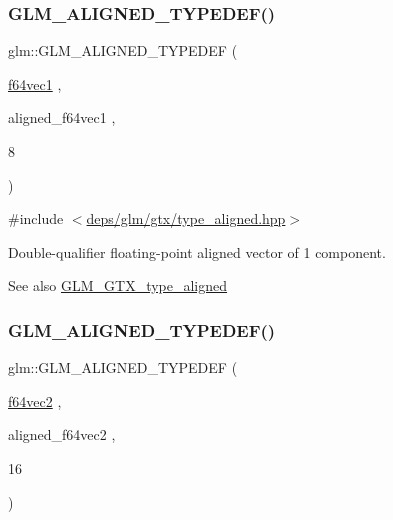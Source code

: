 \subsubsection{\texorpdfstring{G\+L\+M\+\_\+\+A\+L\+I\+G\+N\+E\+D\+\_\+\+T\+Y\+P\+E\+D\+E\+F()}{GLM\_ALIGNED\_TYPEDEF()}\hspace{0.1cm}{\footnotesize\ttfamily [159/209]}}
{\footnotesize\ttfamily glm\+::\+G\+L\+M\+\_\+\+A\+L\+I\+G\+N\+E\+D\+\_\+\+T\+Y\+P\+E\+D\+EF (\begin{DoxyParamCaption}\item[{\hyperlink{group__gtc__type__precision_ga6478d0530433bb907956a46b2cd99161}{f64vec1}}]{,  }\item[{aligned\+\_\+f64vec1}]{,  }\item[{8}]{ }\end{DoxyParamCaption})}



{\ttfamily \#include $<$\hyperlink{gtx_2type__aligned_8hpp}{deps/glm/gtx/type\+\_\+aligned.\+hpp}$>$}

Double-\/qualifier floating-\/point aligned vector of 1 component. \begin{DoxySeeAlso}{See also}
\hyperlink{group__gtx__type__aligned}{G\+L\+M\+\_\+\+G\+T\+X\+\_\+type\+\_\+aligned} 
\end{DoxySeeAlso}
\mbox{\label{group__gtx__type__aligned_ga32814aa0f19316b43134fc25f2aad2b9}} 
\subsubsection{\texorpdfstring{G\+L\+M\+\_\+\+A\+L\+I\+G\+N\+E\+D\+\_\+\+T\+Y\+P\+E\+D\+E\+F()}{GLM\_ALIGNED\_TYPEDEF()}\hspace{0.1cm}{\footnotesize\ttfamily [160/209]}}
{\footnotesize\ttfamily glm\+::\+G\+L\+M\+\_\+\+A\+L\+I\+G\+N\+E\+D\+\_\+\+T\+Y\+P\+E\+D\+EF (\begin{DoxyParamCaption}\item[{\hyperlink{group__gtc__type__precision_ga6c794781267fd5c810d9a6e7086e02a6}{f64vec2}}]{,  }\item[{aligned\+\_\+f64vec2}]{,  }\item[{16}]{ }\end{DoxyParamCaption})}



